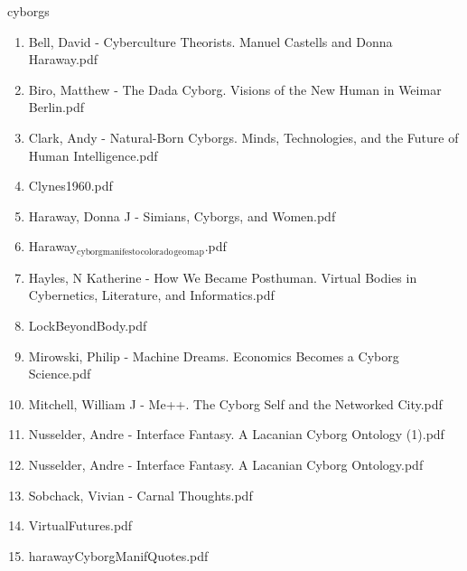 \documentclass[11pt]{article}
\begin{document}
\item cyborgs
\label{sec-1-1-1-1-19}
\begin{enumerate}
\item Bell, David - Cyberculture Theorists. Manuel Castells and Donna Haraway.pdf
\label{sec-1-1-1-1-19-1}

\item Biro, Matthew - The Dada Cyborg. Visions of the New Human in Weimar Berlin.pdf
\label{sec-1-1-1-1-19-2}

\item Clark, Andy - Natural-Born Cyborgs. Minds, Technologies, and the Future of Human Intelligence.pdf
\label{sec-1-1-1-1-19-3}

\item Clynes1960.pdf
\label{sec-1-1-1-1-19-4}

\item Haraway, Donna J - Simians,  Cyborgs, and Women.pdf
\label{sec-1-1-1-1-19-5}

\item Haraway$_{\text{cyborgmanifesto}}$$_{\text{colorado}}$$_{\text{geo}}$$_{\text{map}}$.pdf
\label{sec-1-1-1-1-19-6}

\item Hayles, N Katherine - How We Became Posthuman. Virtual Bodies in Cybernetics, Literature, and Informatics.pdf
\label{sec-1-1-1-1-19-7}

\item LockBeyondBody.pdf
\label{sec-1-1-1-1-19-8}

\item Mirowski, Philip - Machine Dreams. Economics Becomes a Cyborg Science.pdf
\label{sec-1-1-1-1-19-9}

\item Mitchell, William J - Me++. The Cyborg Self and the Networked City.pdf
\label{sec-1-1-1-1-19-10}

\item Nusselder, Andre - Interface Fantasy. A Lacanian Cyborg Ontology (1).pdf
\label{sec-1-1-1-1-19-11}

\item Nusselder, Andre - Interface Fantasy. A Lacanian Cyborg Ontology.pdf
\label{sec-1-1-1-1-19-12}

\item Sobchack, Vivian - Carnal Thoughts.pdf
\label{sec-1-1-1-1-19-13}

\item VirtualFutures.pdf
\label{sec-1-1-1-1-19-14}

\item harawayCyborgManifQuotes.pdf
\label{sec-1-1-1-1-19-15}


\end{enumerate}
\end{document}
